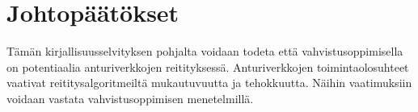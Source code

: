 \section{Johtopäätökset}
Tämän kirjallisuusselvityksen pohjalta voidaan todeta että vahvistusoppimisella
on potentiaalia anturiverkkojen reitityksessä. Anturiverkkojen
toimintaolosuhteet vaativat reititysalgoritmeiltä mukautuvuutta ja tehokkuutta.
Näihin vaatimuksiin voidaan vastata vahvistusoppimisen menetelmillä.

